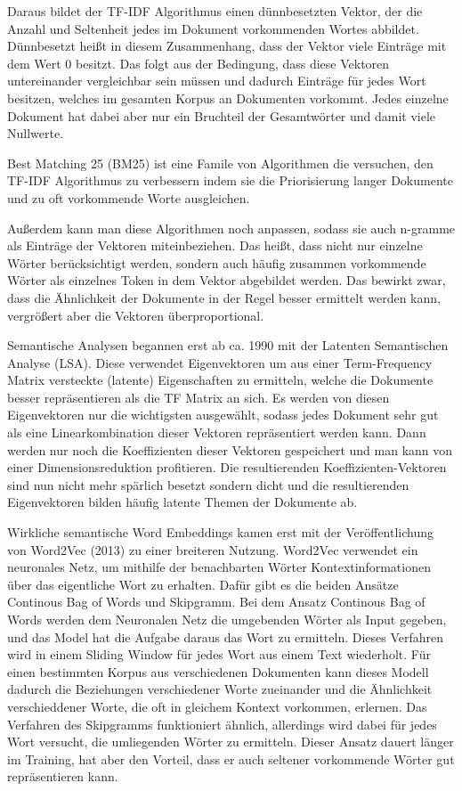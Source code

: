 Daraus bildet der TF-IDF Algorithmus einen dünnbesetzten Vektor, der die Anzahl und Seltenheit jedes im Dokument vorkommenden Wortes abbildet. 
Dünnbesetzt heißt in diesem Zusammenhang, dass der Vektor viele Einträge mit dem Wert 0 besitzt. 
Das folgt aus der Bedingung, dass diese Vektoren untereinander vergleichbar sein müssen und dadurch Einträge für jedes Wort besitzen, welches im gesamten Korpus an Dokumenten vorkommt.
Jedes einzelne Dokument hat dabei aber nur ein Bruchteil der Gesamtwörter und damit viele Nullwerte.

Best Matching 25 (BM25) ist eine Famile von Algorithmen die versuchen, den TF-IDF Algorithmus zu verbessern indem sie die Priorisierung langer Dokumente und zu oft vorkommende Worte ausgleichen.

Außerdem kann man diese Algorithmen noch anpassen, sodass sie auch n-gramme als Einträge der Vektoren miteinbeziehen. 
Das heißt, dass nicht nur einzelne Wörter berücksichtigt werden, sondern auch häufig zusammen vorkommende Wörter als einzelnes Token in dem Vektor abgebildet werden. 
Das bewirkt zwar, dass die Ähnlichkeit der Dokumente in der Regel besser ermittelt werden kann, vergrößert aber die Vektoren überproportional.

Semantische Analysen begannen erst ab ca. 1990 mit der Latenten Semantischen Analyse (LSA).
Diese verwendet Eigenvektoren um aus einer Term-Frequency Matrix versteckte (latente) Eigenschaften zu ermitteln, welche die Dokumente besser repräsentieren als die TF Matrix an sich. 
Es werden von diesen Eigenvektoren nur die wichtigsten ausgewählt, sodass jedes Dokument sehr gut als eine Linearkombination dieser Vektoren repräsentiert werden kann.
Dann werden nur noch die Koeffizienten dieser Vektoren gespeichert und man kann von einer Dimensionsreduktion profitieren.
Die resultierenden Koeffizienten-Vektoren sind nun nicht mehr spärlich besetzt sondern dicht und die resultierenden Eigenvektoren bilden häufig latente Themen der Dokumente ab.

Wirkliche semantische Word Embeddings kamen erst mit der Veröffentlichung von Word2Vec (2013) zu einer breiteren Nutzung. 
Word2Vec verwendet ein neuronales Netz, um mithilfe der benachbarten Wörter Kontextinformationen über das eigentliche Wort zu erhalten. 
Dafür gibt es die beiden Ansätze Continous Bag of Words und Skipgramm.
Bei dem Ansatz Continous Bag of Words werden dem Neuronalen Netz die umgebenden Wörter als Input gegeben, und das Model hat die Aufgabe daraus das Wort zu ermitteln. 
Dieses Verfahren wird in einem Sliding Window für jedes Wort aus einem Text wiederholt. 
Für einen bestimmten Korpus aus verschiedenen Dokumenten kann dieses Modell dadurch die Beziehungen verschiedener Worte zueinander und die Ähnlichkeit verschieddener Worte, die oft in gleichem Kontext vorkommen, erlernen. 
Das Verfahren des Skipgramms funktioniert ähnlich, allerdings wird dabei für jedes Wort versucht, die umliegenden Wörter zu ermitteln. 
Dieser Ansatz dauert länger im Training, hat aber den Vorteil, dass er auch seltener vorkommende Wörter gut repräsentieren kann.

